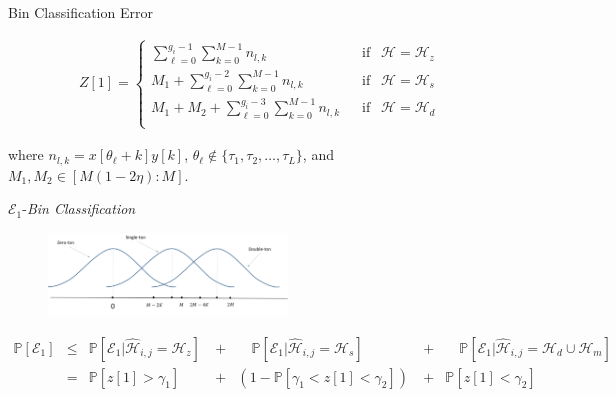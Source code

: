 \documentclass[10pt,xcolor=table]{beamer}
\newcommand{\mc}{\mathcal}
\newcommand{\mbb}{\mathbb}
\begin{document}
\begin{frame}{Bin Classification Error}
\vspace{-10pt}
{ \small
	\begin{align*} \nonumber
	Z[1]=\begin{cases}
	\sum\limits_{\ell=0}^{g_{i}-1}\sum\limits_{k=0}^{M-1} n_{l,k}  & ~~\text{ if } ~~ \mc{H}=\mc{H}_z\label{Eqn:BinCombination}\\
	M_1+\sum\limits_{\ell=0}^{g_{i}-2}\sum\limits_{k=0}^{M-1} n_{l,k}  & ~~\text{ if } ~~ \mc{H}=\mc{H}_s\\
	M_1+M_2+\sum\limits_{\ell=0}^{g_{i}-3}\sum\limits_{k=0}^{M-1} n_{l,k}  & ~~\text{ if } ~~ \mc{H}=\mc{H}_d\\
	\end{cases}
	\end{align*}
	
	where $n_{l,k}=x[\theta_{\ell}+k]y[k]$,  $\theta_{\ell}\notin\{\tau_1,\tau_2,\ldots,\tau_L\}$, and  $M_1,M_2\in[M(1-2\eta):M]$.
}


\begin{block}{$\mathcal{E}_1${-\it Bin Classification}}
	\begin{figure}[t]
		\begin{center}
			\includegraphics[width=2.5in]{bin_statistics.pdf}
		\end{center}
	\end{figure}
	\vspace{-30pt}
	
	{\small \begin{align*}
		\mbb{P}[\mathcal{E}_1] & \leq & \mbb{P}[\mathcal{E}_1|\widehat{\mathcal{H}}_{i,j}=\mc{H}_z]~& + &
		\quad \mbb{P}[\mathcal{E}_1|\widehat{\mathcal{H}}_{i,j}=\mathcal{H}_s]~~~~~& + &
		\quad \mbb{P}[\mc{E}_1|\widehat{\mathcal{H}}_{i,j}=\mathcal{H}_d \cup \mathcal{H}_m]\\
		~& = & \mbb{P}[z[1]>\gamma_1] ~& + & (1- \mbb{P}[\gamma_1<z[1]<\gamma_2])  ~& + & \mbb{P}[z[1]<\gamma_2]~~~~~~\\
		\end{align*}		
	}
	
	\vspace{-15pt}
\end{block}
\end{frame}
\end{document}
